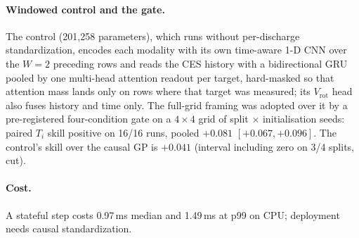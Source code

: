\documentclass[10pt,twocolumn,letterpaper]{article}
\newcommand{\Ti}{\ensuremath{T_i}}
\newcommand{\Vrot}{\ensuremath{V_\mathrm{rot}}}
\begin{document}
\paragraph{Windowed control and the gate.} The control (201{,}258 parameters), which
runs without per-discharge standardization, encodes each modality with its own
time-aware 1-D CNN over the $W{=}2$ preceding rows and reads the CES history with a
bidirectional GRU pooled by one multi-head attention readout per target, hard-masked so
that attention mass lands only on rows where that target was measured; its \Vrot{} head
also fuses history and time only. The full-grid framing was adopted over it by a
pre-registered four-condition gate on a $4\times4$ grid of split $\times$
initialisation seeds: paired \Ti{} skill positive on 16/16 runs, pooled $+0.081$
$[+0.067, +0.096]$. The control's skill over the causal GP is $+0.041$ (interval
including zero on 3/4 splits, cut).

\paragraph{Cost.} A stateful step costs 0.97\,ms median and 1.49\,ms at p99 on CPU;
deployment needs causal standardization.
\end{document}
